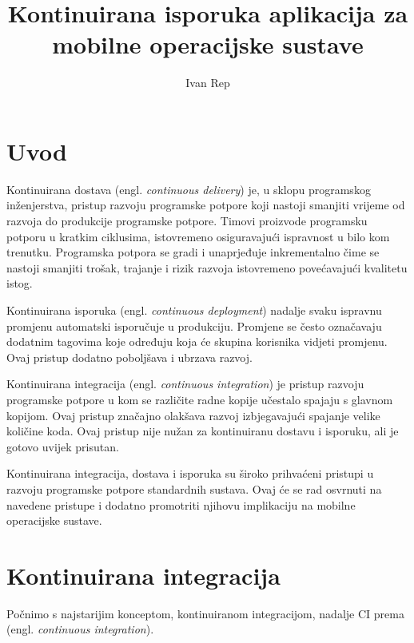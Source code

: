 \documentclass[times, utf8, seminar, numeric]{fer}
\newcommand{\eng}[1]{(engl. \textit{#1})}
\begin{document}
\nocite{*}

\title{Kontinuirana isporuka aplikacija za mobilne operacijske sustave}

\author{Ivan Rep}


\maketitle

\tableofcontents

\chapter{Uvod}
Kontinuirana dostava \eng{continuous delivery} je, u sklopu programskog inženjerstva, pristup razvoju programske potpore koji nastoji smanjiti vrijeme od razvoja do produkcije programske potpore. Timovi proizvode programsku potporu u kratkim ciklusima, istovremeno osiguravajući ispravnost u bilo kom trenutku. Programska potpora se gradi i unaprjeđuje inkrementalno čime se nastoji smanjiti trošak, trajanje i rizik razvoja istovremeno povećavajući kvalitetu istog.

Kontinuirana isporuka \eng{continuous deployment} nadalje svaku ispravnu promjenu automatski isporučuje u produkciju. Promjene se često označavaju dodatnim tagovima koje određuju koja će skupina korisnika vidjeti promjenu. Ovaj pristup dodatno poboljšava i ubrzava razvoj.

Kontinuirana integracija \eng{continuous integration} je pristup razvoju programske potpore u kom se različite radne kopije učestalo spajaju s glavnom kopijom. Ovaj pristup značajno olakšava razvoj izbjegavajući spajanje velike količine koda. Ovaj pristup nije nužan za kontinuiranu dostavu i isporuku, ali je gotovo uvijek prisutan.

Kontinuirana integracija, dostava i isporuka su široko prihvaćeni pristupi u razvoju programske potpore standardnih sustava. Ovaj će se rad osvrnuti na navedene pristupe i dodatno promotriti njihovu implikaciju na mobilne operacijske sustave.

\chapter{Kontinuirana integracija}
Počnimo s najstarijim konceptom, kontinuiranom integracijom, nadalje CI prema \eng{continuous integration}. 
\end{document}
